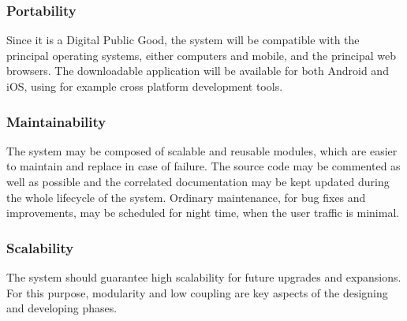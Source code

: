 \subsubsection{Portability}
Since it is a Digital Public Good, the system will be compatible with the principal operating systems, either computers and mobile, and the principal web browsers. The downloadable application will be available for both Android and iOS, using for example cross platform development tools.
\subsubsection{Maintainability}
The system may be composed of scalable and reusable modules, which are easier to maintain and replace in case of failure. The source code may be commented as well as possible and the correlated documentation may be kept updated during the whole lifecycle of the system. Ordinary maintenance, for bug fixes and improvements, may be scheduled for night time, when the user traffic is minimal.
\subsubsection{Scalability}
The system should guarantee high scalability for future upgrades and expansions. For this purpose, modularity and low coupling are key aspects of the designing and developing phases.